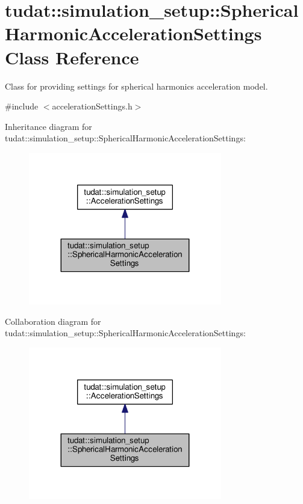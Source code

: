 \hypertarget{classtudat_1_1simulation__setup_1_1SphericalHarmonicAccelerationSettings}{}\section{tudat\+:\+:simulation\+\_\+setup\+:\+:Spherical\+Harmonic\+Acceleration\+Settings Class Reference}
\label{classtudat_1_1simulation__setup_1_1SphericalHarmonicAccelerationSettings}


Class for providing settings for spherical harmonics acceleration model.  




{\ttfamily \#include $<$acceleration\+Settings.\+h$>$}



Inheritance diagram for tudat\+:\+:simulation\+\_\+setup\+:\+:Spherical\+Harmonic\+Acceleration\+Settings\+:
\nopagebreak
\begin{figure}[H]
\begin{center}
\leavevmode
\includegraphics[width=239pt]{classtudat_1_1simulation__setup_1_1SphericalHarmonicAccelerationSettings__inherit__graph}
\end{center}
\end{figure}


Collaboration diagram for tudat\+:\+:simulation\+\_\+setup\+:\+:Spherical\+Harmonic\+Acceleration\+Settings\+:
\nopagebreak
\begin{figure}[H]
\begin{center}
\leavevmode
\includegraphics[width=239pt]{classtudat_1_1simulation__setup_1_1SphericalHarmonicAccelerationSettings__coll__graph}
\end{center}
\end{figure}
